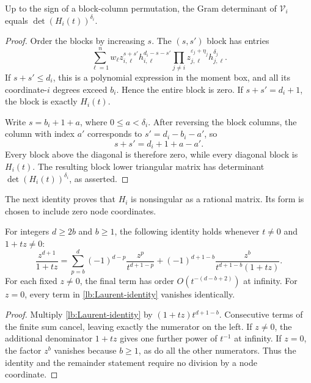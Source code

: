 \begin{lemma}
\label{lb:anti-triangular}
Up to the sign of a block-column permutation, the Gram determinant of
\(\mathcal V_i\) equals \(\det(H_i(t))^{\delta_i}\).
\end{lemma}

\begin{proof}
Order the blocks by increasing \(s\).  The \((s,s')\) block has entries
\begin{equation}
  \sum_{\ell=1}^{n}w_\ell
     z_{i,\ell}^{s+s'}h_{i,\ell}^{d_i-s-s'}
     \prod_{j\neq i}
       z_{j,\ell}^{\varepsilon_j+\eta_j}h_{j,\ell}^{\delta_j}.
  \label{lb:V-block}
\end{equation}
If \(s+s'\leq d_i\), this is a polynomial expression in the moment
box, and all its coordinate-\(i\) degrees exceed \(b_i\).  Hence
the entire block is zero.  If \(s+s'=d_i+1\), the block is exactly
\(H_i(t)\).

Write \(s=b_i+1+a\), where \(0\leq a<\delta_i\).  After reversing
the block columns, the column with index \(a'\) corresponds to
\(s'=d_i-b_i-a'\), so
\[
  s+s'=d_i+1+a-a'.
\]
Every block above the diagonal is therefore zero, while every diagonal
block is \(H_i(t)\).  The resulting block lower triangular matrix has
determinant \(\det(H_i(t))^{\delta_i}\), as asserted.
\end{proof}

The next identity proves that \(H_i\) is nonsingular as a rational
matrix.  Its form is chosen to include zero node coordinates.

\begin{lemma}
\label{lb:Laurent}
For integers \(d\geq2b\) and \(b\geq1\), the following identity holds
whenever \(t\neq0\) and \(1+tz\neq0\):
\begin{equation}
  \frac{z^{d+1}}{1+tz}
   =\sum_{p=b}^{d}(-1)^{d-p}
       \frac{z^p}{t^{d+1-p}}
     +(-1)^{d+1-b}
       \frac{z^b}{t^{d+1-b}(1+tz)}.
  \label{lb:Laurent-identity}
\end{equation}
For each fixed \(z\neq0\), the final term has order
\(O(t^{-(d-b+2)})\) at infinity.  For \(z=0\), every term in
\eqref{lb:Laurent-identity} vanishes identically.
\end{lemma}

\begin{proof}
Multiply \eqref{lb:Laurent-identity} by
\((1+tz)t^{d+1-b}\).  Consecutive terms of the finite sum cancel,
leaving exactly the numerator on the left.  If \(z\neq0\), the
additional denominator \(1+tz\) gives one further power of
\(t^{-1}\) at infinity.  If \(z=0\), the factor \(z^b\) vanishes
because \(b\geq1\), as do all the other numerators.  Thus the
identity and the remainder statement require no division by a node
coordinate.
\end{proof}

